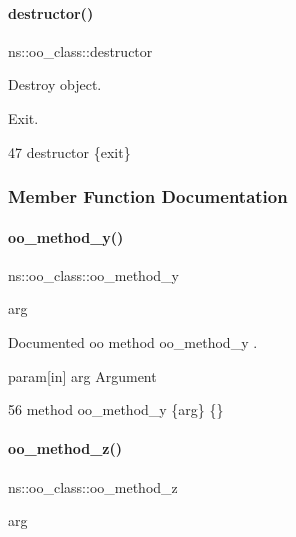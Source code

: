 \paragraph{\texorpdfstring{destructor()}{destructor()}}
{\footnotesize\ttfamily ns\+::oo\+\_\+class\+::destructor}



Destroy object. 

Exit. 
\begin{DoxyCode}
47     \textcolor{keyword}{destructor} \{\textcolor{keyword}{exit}\}
\end{DoxyCode}


\subsubsection{Member Function Documentation}
\mbox{\label{classns_1_1oo__class_ad07feb192f34010ed66d123338c7acdd}} 
\paragraph{\texorpdfstring{oo\+\_\+method\+\_\+y()}{oo\_method\_y()}}
{\footnotesize\ttfamily ns\+::oo\+\_\+class\+::oo\+\_\+method\+\_\+y\begin{DoxyParamCaption}\item[{}]{arg  }\end{DoxyParamCaption}\hspace{0.3cm}{\ttfamily [protected]}}



Documented oo method {\ttfamily oo\+\_\+method\+\_\+y} . 

param\mbox{[}in\mbox{]} arg Argument 
\begin{DoxyCode}
56     \textcolor{keyword}{method} oo\_method\_y \{arg\} \{\}
\end{DoxyCode}
\mbox{\label{classns_1_1oo__class_a8a3cfbae3b3fca463f08adb9174a5fe8}} 
\paragraph{\texorpdfstring{oo\+\_\+method\+\_\+z()}{oo\_method\_z()}}
{\footnotesize\ttfamily ns\+::oo\+\_\+class\+::oo\+\_\+method\+\_\+z\begin{DoxyParamCaption}\item[{}]{arg  }\end{DoxyParamCaption}}



